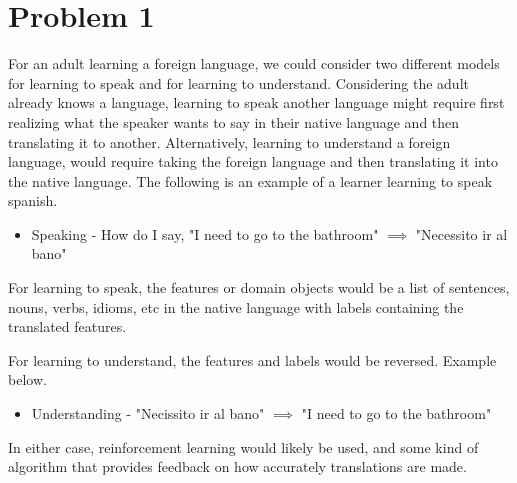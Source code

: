 \subsectionfont{\fontsize{10}{10}\selectfont}

\section{Problem 1}%
For an adult learning a foreign language, we could consider
two different models for learning to speak and for learning to understand.
Considering the adult already knows a language, learning to speak another
language might require first realizing what the speaker wants to say in their
native language and then translating it to another. Alternatively, learning to
understand a foreign language, would require taking the foreign language and
then translating it into the native language. The following is an example of
a learner learning to speak spanish.

\begin{itemize}
  \item Speaking - How do I say, "I need to go to the bathroom" $\implies$ "Necessito ir al bano"
\end{itemize}

For learning to speak, the features or domain objects would be a list of sentences,
nouns, verbs, idioms, etc in the native language with labels containing the
translated features.

For learning to understand, the features and labels would be reversed. Example
below.

\begin{itemize}
  \item Understanding - "Necissito ir al bano" $\implies$ "I need to go to the bathroom"
\end{itemize}

In either case, reinforcement learning would likely be used, and some kind of
algorithm that provides feedback on how accurately translations are made. 

